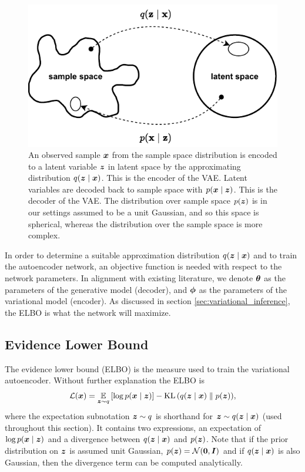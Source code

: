 \begin{figure}[H]
    \centering
    \includegraphics[width=0.7\linewidth]{report/figures/enocde_decode.pdf}
    \caption{An observed sample $\bm{ x }$ from the sample space distribution is encoded to a latent variable $\bm{ z }$ in latent space by the approximating distribution $q(\bm{ z } \mid \bm{ x })$. This is the encoder of the VAE. Latent variables are decoded back to sample space with $p(\bm{ x } \mid \bm{ z })$. This is the decoder of the VAE. The distribution over sample space $p(\bm{ z })$ is in our settings assumed to be a unit Gaussian, and so this space is spherical, whereas the distribution over the sample space is more complex.}
    \label{fig:samplelatentspace}
\end{figure}

In order to determine a suitable approximation distribution $q(\bm{ z } \mid \bm{ x })$ and to train the autoencoder network, an objective function is needed with respect to the network parameters. In alignment with existing literature, we denote $\bm{ \theta }$ as the parameters of the generative model (decoder), and $\bm{ \phi }$ as the parameters of the variational model (encoder). As discussed in section \ref{sec:variational_inference}, the ELBO is what the network will maximize.

\subsection{Evidence Lower Bound}
\label{sec:elbo}
The evidence lower bound (ELBO) is the measure used to train the variational autoencoder. Without further explanation the ELBO is
\begin{equation}
    \mathcal{L}(\bm{ x }) = \operatorname*{\mathbb{E}}_{\bm{ z }\sim q}{\mathopen{} \left[ \log p(\bm{ x } \mid \bm{ z }) \right] \mathclose{}} - \operatorname{KL}{\mathopen{} \left(q(\bm{ z } \mid \bm{ x }) \parallel p(\bm{ z })\right) \mathclose{}}\label{eq:elbo},
\end{equation}
where the expectation subnotation $\bm{ z } \sim q$ is shorthand for $\bm{ z } \sim q(\bm{ z } \mid \bm{ x })$ (used throughout this section). It contains two expressions, an expectation of $\log p(\bm{ x } \mid \bm{ z })$ and a divergence between $q(\bm{ z } \mid \bm{ x })$ and $p(\bm{ z })$. Note that if the prior distribution on $\bm{ z }$ is assumed unit Gaussian, $p(\bm{ z }) = \mathcal{N}(\bm{ 0 }, \bm{ I })$ and if $q(\bm{ z } \mid \bm{ x })$ is also Gaussian, then the divergence term can be computed analytically.


